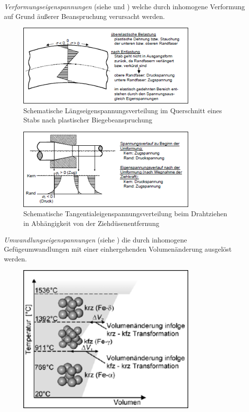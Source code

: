 \documentclass[12pt,a4paper,parskip]{scrartcl}
\begin{document}
{\begin{itemize*}
\item \emph{Verformungseigenspannungen} (siehe  und ) welche durch inhomogene Verformung auf Grund äußerer Beanspruchung verursacht werden.\begin{figure}
  \centering
  \includegraphics[width=0.8\textwidth]{eigenspanfaser}
  \caption[Längseigenspannungsverteilung eines Stabquerschnittes]{Schematische Längseigenspannungsverteilung im Querschnitt eines Stabs nach plastischer Biegebeanspruchung\protect\footnotemark}
  \label{fig:eigenspanfaser}
  \end{figure}
  \begin{figure}
  \centering
  \includegraphics[width=0.8\textwidth]{eigenspandrahtzieh}
  \caption[Eigenspannungsverteilung Drahtziehen]{Schematische Tangentialeigenspannungsverteilung beim Drahtziehen in Abhängigkeit von der Ziehdüsenentfernung\protect\footnotemark}
  \label{fig:eigenspandrahtzieh}
  \end{figure}
\item \emph{Umwandlungseigenspannungen} (siehe ) die durch inhomogene Gefügeumwandlungen  
mit einer einhergehenden Volumenänderung ausgelöst werden.\begin{figure}
  \centering
  \includegraphics[width=0.8\textwidth]{eigenspanmol}

\end{figure}
\end{itemize*}}
\end{document}
